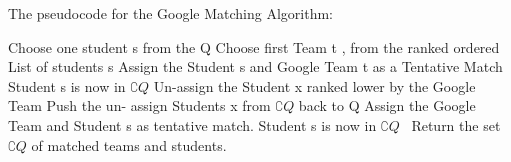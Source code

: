 \documentclass[10 pt]{article}
\begin{document}
The pseudocode  for the Google Matching Algorithm:
\begin{algorithmic}
    \State 
    Choose one student s  from the Q 
             \State 
                Choose first Team  t , from the ranked ordered List of students s 
                     \State
                            \State Assign the Student  s and Google Team  t as a Tentative Match
                            \State Student  s is now in  $ \complement{Q} $
                           \State
                          Un-assign the Student  x ranked lower by the Google Team
                          \State 
                          Push the un- assign Students x  from  $\complement{Q} $ back to  Q
                          \State
                         Assign the Google Team and  Student s  as tentative match.
                         \State Student  s is now in $\complement{Q} $
    \EndIf
     \EndIf
     \EndFor
     \EndWhile
    \ Return the set $\complement{Q} $ of matched teams and students.\\
  
\end{algorithmic}
\end{document}
